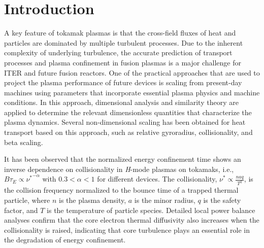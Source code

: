 \documentclass[english,aip,pop,superscriptaddress,preprint,letterpaper]{revtex4-2}
\begin{document}
\section{Introduction}

A key feature of tokamak plasmas is that the cross-field fluxes of heat and particles are dominated by multiple turbulent processes.\cite{liewerMeasurementsMicroturbulenceTokamaks1985,woottonFluctuationsAnomalousTransport1990,doyleChapterPlasmaConfinement2007}
Due to the inherent complexity of underlying turbulence, the accurate prediction of transport processes and plasma confinement in fusion plasmas is a major challenge for ITER and future fusion reactors.
One of the practical approaches that are used to project the plasma performance of future devices is scaling from present-day machines using parameters that incorporate essential plasma physics and machine conditions.\cite{doyleChapterPlasmaConfinement2007,luceApplicationDimensionlessParameter2008}
In this approach, dimensional analysis and similarity theory are applied to determine the relevant dimensionless quantities that characterize the plasma dynamics.
Several non-dimensional scaling has been obtained for heat transport based on this approach, such as relative gyroradius,\cite{pettyNondimensionalTransportScaling1995,cordeyITERSimulationExperiments1996} collisionality,\cite{greenwaldTransportPhenomenaAlcator1998,pettyScalingHeatTransport1999,zastrowTritiumTransportExperiments2004} and beta scaling.\cite{pettyBetaScalingTransport2004,christiansenScalingConfinement1998}

It has been observed that the normalized energy confinement time shows an inverse dependence on collisionality in \emph{H}-mode plasmas on tokamaks,\cite{luceApplicationDimensionlessParameter2008} i.e., $B\tau_{E} \propto {\nu^{*}}^{-\alpha}$ with $0.3<\alpha<1$ for different devices.
The collisionality, $\nu^{*}\propto\frac{naq}{T^{2}}$, is the collision frequency normalized to the bounce time of a trapped thermal particle, where $n$ is the plasma density, $a$ is the minor radius, \(q\) is the safety factor, and $T$ is the temperature of particle species.
Detailed local power balance analyses confirm that the core electron thermal diffusivity also increases when the collisionality is raised,\cite{pettyScalingHeatTransport1999} indicating that core turbulence plays an essential role in the degradation of energy confinement.
\end{document}
